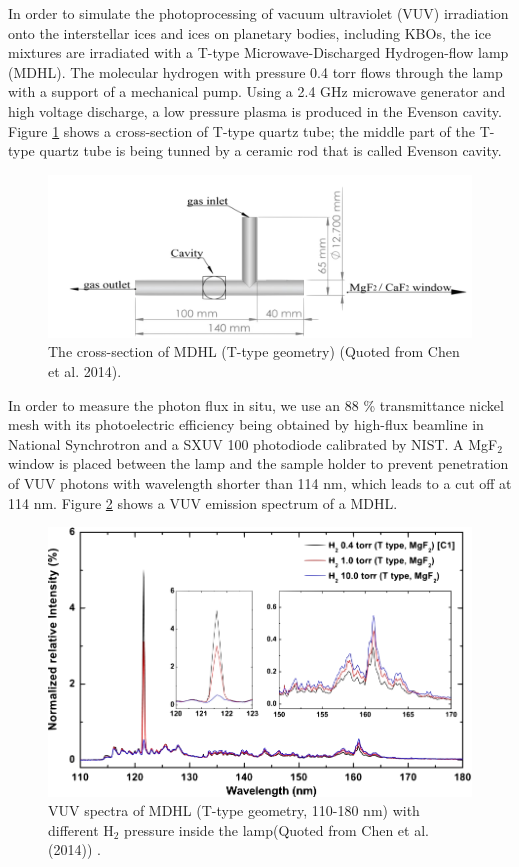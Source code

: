In order to simulate the photoprocessing of vacuum ultraviolet (VUV) irradiation onto the interstellar ices and ices on planetary bodies, including KBOs, the ice mixtures are irradiated with a T-type Microwave-Discharged Hydrogen-flow lamp (MDHL). The molecular hydrogen with pressure 0.4 torr flows through the lamp with a support of a mechanical pump. Using a 2.4 GHz microwave generator and high voltage discharge, a low pressure plasma is produced in the Evenson cavity. Figure \ref{fig:T_type} shows a cross-section of T-type quartz tube; the middle part of the T-type quartz tube is being tunned by a ceramic rod that is called Evenson cavity.
\begin{figure}
\centering
\includegraphics[width=\textwidth]{figures/chapter2/T_type.png}
\caption{The cross-section of MDHL (T-type geometry) (Quoted from Chen et al. 2014).}
\label{fig:T_type}
\end{figure}
In order to measure the photon flux in situ, we use an 88 \% transmittance nickel mesh with its photoelectric efficiency being obtained by high-flux beamline in National Synchrotron and a SXUV 100 photodiode calibrated by NIST. A MgF$_2$ window is placed between the lamp and the sample holder to prevent penetration of VUV photons with wavelength shorter than 114 nm, which leads to a cut off at 114 nm. Figure \ref{fig:MDHL} shows a VUV emission spectrum of a MDHL.
\begin{figure}
\centering
\includegraphics[width=\textwidth]{figures/chapter2/MDHL.png}
\caption{VUV spectra of MDHL (T-type geometry, 110-180 nm) with different H$_2$ pressure inside the lamp(Quoted from Chen et al. (2014)\cite{chen2013vacuum}) .}
\label{fig:MDHL}
\end{figure}
